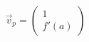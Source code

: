\documentclass[preview]{standalone}
\begin{document}
\begin{align*}
\vec{v}_p=\begin{pmatrix}1\\ f'(a) \end{pmatrix}
\end{align*}
\end{document}
